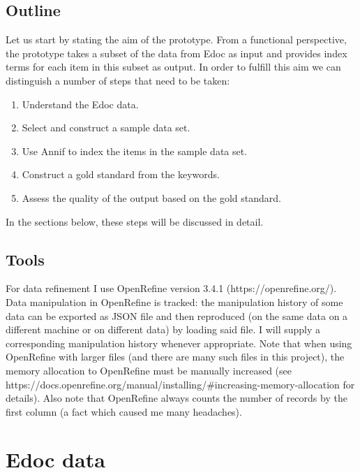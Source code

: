 \hypertarget{outline}{%
\subsection{Outline}\label{outline}}

Let us start by stating the aim of the prototype. From a functional
perspective, the prototype takes a subset of the data from Edoc as input
and provides index terms for each item in this subset as output. In
order to fulfill this aim we can distinguish a number of steps that need
to be taken:

\begin{enumerate}
\def\labelenumi{\arabic{enumi}.}
\tightlist
\item
  Understand the Edoc data.\\
\item
  Select and construct a sample data set.
\item
  Use Annif to index the items in the sample data set.
\item
  Construct a gold standard from the keywords.
\item
  Assess the quality of the output based on the gold standard.
\end{enumerate}

In the sections below, these steps will be discussed in detail.

\hypertarget{tools}{%
\subsection{Tools}\label{tools}}

For data refinement I use OpenRefine version 3.4.1
(https://openrefine.org/). Data manipulation in OpenRefine is tracked:
the manipulation history of some data can be exported as JSON file and
then reproduced (on the same data on a different machine or on different
data) by loading said file. I will supply a corresponding manipulation
history whenever appropriate. Note that when using OpenRefine with
larger files (and there are many such files in this project), the memory
allocation to OpenRefine must be manually increased (see
https://docs.openrefine.org/manual/installing/\#increasing-memory-allocation
for details). Also note that OpenRefine always counts the number of
records by the first column (a fact which caused me many headaches).

\hypertarget{edoc-data}{%
\section{Edoc data}\label{edoc-data}}

